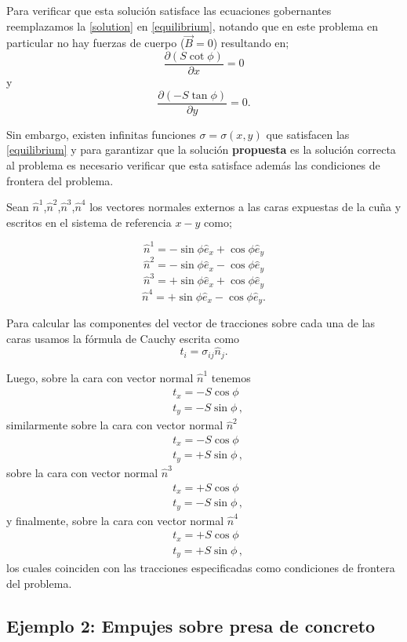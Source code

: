\documentclass[../notas medios.tex]{subfiles}
\begin{document}
Para verificar que esta solución satisface las ecuaciones gobernantes reemplazamos la \cref{solution} en \cref{equilibrium}, notando que en este problema en particular no hay fuerzas de cuerpo ($\vec B = 0$)  resultando en;
\[\frac{\partial (S \cot\phi )}{\partial x} = 0\]
y
\[\frac{\partial (-S\tan\phi)}{\partial y} = 0.\]


Sin embargo, existen infinitas funciones $\sigma  = \sigma (x,y)$  que satisfacen las \cref{equilibrium} y para garantizar que la solución {\bf propuesta} es la solución correcta al problema es necesario verificar que esta satisface además las condiciones de frontera del problema.

Sean $\hat{n}^1$,$\hat{n}^2$,$\hat{n}^3$,$\hat{n}^4$ los vectores normales externos a las caras expuestas de la cuña y escritos en el sistema de referencia $x-y$ como;

\[\hat{n}^1 = -\sin\phi \hat{e}_{x} + \cos\phi \hat{e}_{y}\]
\[\hat{n}^2 = -\sin\phi \hat{e}_{x} - \cos\phi \hat{e}_{y}\]
\[\hat{n}^3 = +\sin\phi \hat{e}_{x} + \cos\phi \hat{e}_{y}\]
\[\hat{n}^4 = +\sin\phi \hat{e}_{x} - \cos\phi \hat{e}_{y}.\]


Para calcular las componentes del vector de tracciones sobre cada una de las caras usamos la fórmula de Cauchy escrita como
\[t_{i}=\sigma_{ij}\hat{n}_{j}.\]

Luego, sobre la cara con vector normal $\hat{n}^1$ tenemos
\begin{align*}
&t_{x}=-S \cos\phi\\
&t_{y}=-S \sin\phi\, ,
\end{align*}
similarmente sobre la cara con vector normal $\hat{n}^2$
\begin{align*}
&t_{x}=-S \cos\phi\\
&t_{y}=+S \sin\phi\, ,
\end{align*}
sobre la cara con vector normal $\hat{n}^3$
\begin{align*}
&t_{x} = +S \cos\phi\\
&t_{y} = -S \sin\phi\, ,
\end{align*}
y finalmente, sobre la cara con vector normal $\hat{n}^4$
\begin{align*}
&t_{x} = +S \cos\phi\\
&t_{y} = +S \sin\phi\, ,
\end{align*}
los cuales coinciden con las tracciones especificadas como condiciones de frontera del problema.


\subsection*{Ejemplo 2: Empujes sobre presa de concreto}
\end{document}
